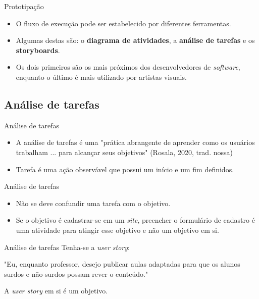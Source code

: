\documentclass[11pt]{beamer}
\begin{document}
    \begin{frame}{Prototipação}
      \begin{itemize}
          \item O fluxo de execução pode ser estabelecido por diferentes ferramentas.
          \item Algumas destas são: o \textbf{diagrama de atividades}, a \textbf{análise de tarefas} e os \textbf{storyboards}.
          \item Os dois primeiros são os mais próximos dos desenvolvedores de \textit{software}, enquanto o último é mais utilizado por artistas visuais.
      \end{itemize}
    \end{frame}

    \subsection{Análise de tarefas}

    \begin{frame}{Análise de tarefas}
      \begin{itemize}
          \item A análise de tarefas é uma "prática abrangente de aprender como os usuários trabalham ... para alcançar seus objetivos" (Rosala, 2020, trad. nossa)
          \item Tarefa é uma ação observável que possui um início e um fim definidos.
      \end{itemize}
    \end{frame}

    \begin{frame}{Análise de tarefas}
      \begin{itemize}
          \item Não se deve confundir uma tarefa com o objetivo.
          \item Se o objetivo é cadastrar-se em um \textit{site}, preencher o formulário de cadastro é uma atividade para atingir esse objetivo e não um objetivo em si.
      \end{itemize}
    \end{frame}

    \begin{frame}{Análise de tarefas}
      Tenha-se a \textit{user story}:
      
      "Eu, enquanto professor, desejo publicar aulas adaptadas para que os alunos surdos e não-surdos possam rever o conteúdo."

      A \textit{user story} em si é um objetivo.
    \end{frame}
\end{document}
